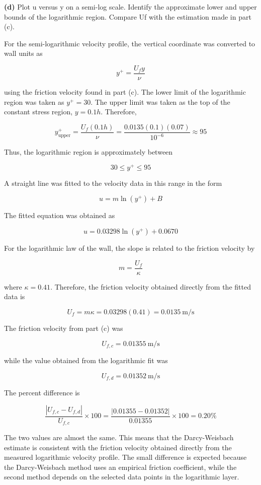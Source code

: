 \documentclass[a4paper]{article}
\begin{document}
\vspace{0.4cm}
\noindent\textbf{(d)} Plot u versus y on a semi-log scale. Identify
the approximate lower and upper bounds of the logarithmic region. Compare Uf with the estimation made in part (c).

For the semi-logarithmic velocity profile, the vertical coordinate was converted to wall units as

\[
y^+ = \frac{U_f y}{\nu}
\]

using the friction velocity found in part (c). The lower limit of the logarithmic region was taken as $y^+ = 30$. The upper limit was taken as the top of the constant stress region, $y = 0.1h$. Therefore,

\[
y^+_{\text{upper}}
=
\frac{U_f(0.1h)}{\nu}
=
\frac{0.0135(0.1)(0.07)}{10^{-6}}
\approx 95
\]

Thus, the logarithmic region is approximately between

\[
30 \leq y^+ \leq 95
\]

A straight line was fitted to the velocity data in this range in the form

\[
u = m\ln(y^+) + B
\]

The fitted equation was obtained as

\[
u = 0.03298\ln(y^+) + 0.0670
\]

For the logarithmic law of the wall, the slope is related to the friction velocity by

\[
m = \frac{U_f}{\kappa}
\]

where $\kappa = 0.41$. Therefore, the friction velocity obtained directly from the fitted data is

\[
U_f = m\kappa = 0.03298(0.41) = 0.0135~\text{m/s}
\]

The friction velocity from part (c) was

\[
U_{f,c} = 0.01355~\text{m/s}
\]

while the value obtained from the logarithmic fit was

\[
U_{f,d} = 0.01352~\text{m/s}
\]

The percent difference is

\[
\frac{|U_{f,c}-U_{f,d}|}{U_{f,c}}\times100
=
\frac{|0.01355-0.01352|}{0.01355}\times100
=
0.20\%
\]

The two values are almost the same. This means that the Darcy-Weisbach estimate is consistent with the friction velocity obtained directly from the measured logarithmic velocity profile. The small difference is expected because the Darcy-Weisbach method uses an empirical friction coefficient, while the second method depends on the selected data points in the logarithmic layer.
\end{document}
